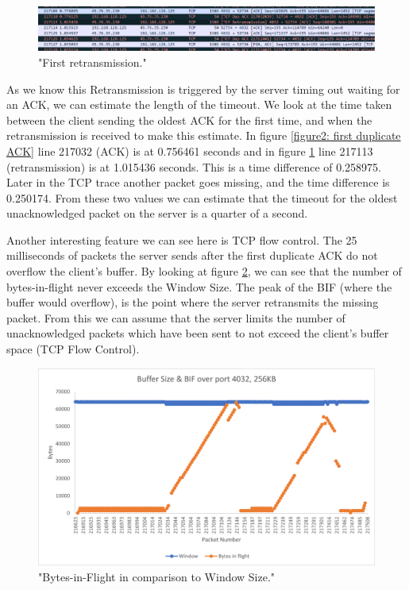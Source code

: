 \documentclass[12pt]{article}
\begin{document}
\begin{figure}[!htbp]
  \centering
  \includegraphics[width=\linewidth]{4032-256KB-retransmission.PNG}
  \caption{"First retransmission."}
  \label{figure4: First retransmission}
\end{figure}

As we know this Retransmission is triggered by the server timing out waiting for an ACK, we can estimate the length of the timeout.
We look at the time taken between the client sending the oldest ACK for the first time, and when the retransmission is received to make this estimate.
In figure \ref{figure2: first duplicate ACK} line 217032 (ACK) is at 0.756461 seconds and in figure \ref{figure4: First retransmission} line 217113 (retransmission) is at 1.015436 seconds.
This is a time difference of 0.258975.
Later in the TCP trace another packet goes missing, and the time difference is 0.250174.
From these two values we can estimate that the timeout for the oldest unacknowledged packet on the server is a quarter of a second.

Another interesting feature we can see here is TCP flow control.
The 25 milliseconds of packets the server sends after the first duplicate ACK do not overflow the client's buffer.
By looking at figure \ref{figure3: BIF and Window Size}, we can see that the number of bytes-in-flight never exceeds the Window Size.
The peak of the BIF (where the buffer would overflow), is the point where the server retransmits the missing packet.
From this we can assume that the server limits the number of unacknowledged packets which have been sent to not exceed the client's buffer space (TCP Flow Control).

\begin{figure}[!htbp]
  \centering
  \includegraphics[width=\linewidth]{4032-256KB-bytes-in-flight.png}
  \caption{"Bytes-in-Flight in comparison to Window Size."}
  \label{figure3: BIF and Window Size}
\end{figure}
\end{document}
